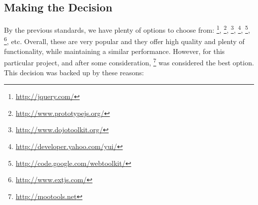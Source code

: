
\subsection{Making the Decision} %
\label{sub:decision}

By the previous standards, we have plenty of options to choose from:
\footnote{\url{http://jquery.com/}},
\footnote{\url{http://www.prototypejs.org/}},
\footnote{\url{http://www.dojotoolkit.org/}},
\footnote{\url{http://developer.yahoo.com/yui/}},
\footnote{\url{http://code.google.com/webtoolkit/}},
\footnote{\url{http://www.extjs.com/}}, etc.
Overall, these are very popular and they offer high quality and plenty of functionality, while maintaining a similar performance.
However, for this particular project, and after some consideration, \footnote{\url{http://mootools.net}} was considered the best option.
This decision was backed up by these reasons:

